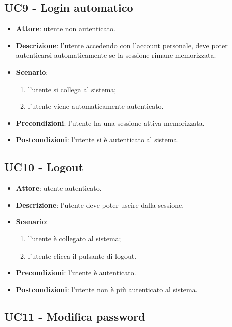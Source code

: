 \subsection{UC9 - Login automatico}
\begin{itemize}
    \item \textbf{Attore}: utente non autenticato.
    \item \textbf{Descrizione}: l'utente accedendo con l'account personale, deve poter autenticarsi automaticamente se la sessione rimane memorizzata.
    \item \textbf{Scenario}:
    \begin{enumerate}
        \item l'utente si collega al sistema;
        \item l'utente viene automaticamente autenticato.
    \end{enumerate}

    \item \textbf{Precondizioni}: l'utente ha una sessione attiva memorizzata.
    \item \textbf{Postcondizioni}: l'utente si è autenticato al sistema.
\end{itemize}

\subsection{UC10 - Logout}
\begin{itemize}
    \item \textbf{Attore}: utente autenticato.
    \item \textbf{Descrizione}: l'utente deve poter uscire dalla sessione.
    \item \textbf{Scenario}:
    \begin{enumerate}
        \item l'utente è collegato al sistema;
        \item l'utente clicca il pulsante di logout.
    \end{enumerate}

    \item \textbf{Precondizioni}: l'utente è autenticato.
    \item \textbf{Postcondizioni}: l'utente non è più autenticato al sistema.
\end{itemize}

\subsection{UC11 - Modifica password}

